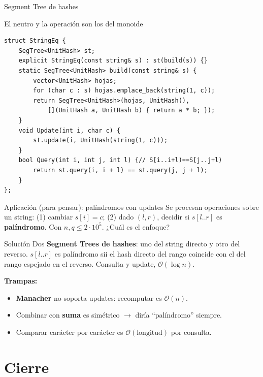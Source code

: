 \documentclass{beamer}
\begin{document}
\begin{frame}[fragile]{Segment Tree de hashes}
\begin{exampleblock}{El neutro y la operación son los del monoide}
{\footnotesize
\begin{verbatim}
struct StringEq {
    SegTree<UnitHash> st;
    explicit StringEq(const string& s) : st(build(s)) {}
    static SegTree<UnitHash> build(const string& s) {
        vector<UnitHash> hojas;
        for (char c : s) hojas.emplace_back(string(1, c));
        return SegTree<UnitHash>(hojas, UnitHash(),
            [](UnitHash a, UnitHash b) { return a * b; });
    }
    void Update(int i, char c) {
        st.update(i, UnitHash(string(1, c)));
    }
    bool Query(int i, int j, int l) {// S[i..i+l)==S[j..j+l)
        return st.query(i, i + l) == st.query(j, j + l);
    }
};
\end{verbatim}
}
\end{exampleblock}
\end{frame}

\begin{frame}{Aplicación (para pensar): palíndromos con updates}
Se procesan operaciones sobre un string: (1) cambiar $s[i]=c$; (2) dado $(l, r)$, decidir si $s[l..r]$ es \textbf{palíndromo}. Con $n, q \le 2\cdot 10^5$. ¿Cuál es el enfoque?
\pause
\begin{block}{Solución}
\footnotesize
Dos \textbf{Segment Trees de hashes}: uno del string directo y otro del reverso. $s[l..r]$ es palíndromo sii el hash directo del rango coincide con el del rango espejado en el reverso. Consulta y update, $\mathcal{O}(\log n)$.

\textbf{Trampas:}
\begin{itemize}
    \item \textbf{Manacher} no soporta updates: recomputar es $\mathcal{O}(n)$.
    \item Combinar con \textbf{suma} es simétrico $\to$ diría ``palíndromo'' siempre.
    \item Comparar carácter por carácter es $\mathcal{O}(\text{longitud})$ por consulta.
\end{itemize}
\end{block}
\end{frame}

\section{Cierre}
\end{document}
